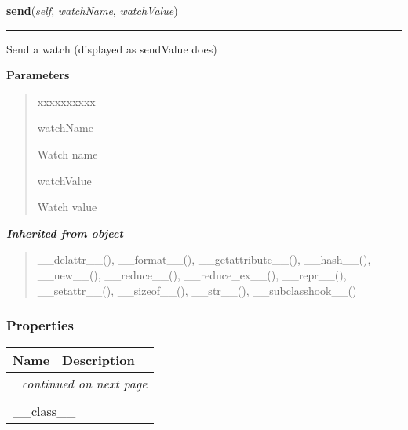 \hspace{.8\funcindent}\begin{boxedminipage}{\funcwidth}

    \raggedright \textbf{send}(\textit{self}, \textit{watchName}, \textit{watchValue})

    \vspace{-1.5ex}

    \rule{\textwidth}{0.5\fboxrule}
\setlength{\parskip}{2ex}
    Send a watch (displayed as sendValue does)

\setlength{\parskip}{1ex}
      \textbf{Parameters}
      \vspace{-1ex}

      \begin{quote}
        \begin{Ventry}{xxxxxxxxxx}

          \item[watchName]

          Watch name

          \item[watchValue]

          Watch value

        \end{Ventry}

      \end{quote}

    \end{boxedminipage}


\large{\textbf{\textit{Inherited from object}}}

\begin{quote}
\_\_delattr\_\_(), \_\_format\_\_(), \_\_getattribute\_\_(), \_\_hash\_\_(), \_\_new\_\_(), \_\_reduce\_\_(), \_\_reduce\_ex\_\_(), \_\_repr\_\_(), \_\_setattr\_\_(), \_\_sizeof\_\_(), \_\_str\_\_(), \_\_subclasshook\_\_()
\end{quote}


  \subsubsection{Properties}

    \vspace{-1cm}
\hspace{\varindent}\begin{longtable}{|p{\varnamewidth}|p{\vardescrwidth}|l}
\cline{1-2}
\cline{1-2} \centering \textbf{Name} & \centering \textbf{Description}& \\
\cline{1-2}
\endhead\cline{1-2}\multicolumn{3}{r}{\small\textit{continued on next page}}\\\endfoot\cline{1-2}
\endlastfoot\multicolumn{2}{|l|}{\textit{Inherited from object}}\\
\multicolumn{2}{|p{\varwidth}|}{\raggedright \_\_class\_\_}\\
\cline{1-2}
\end{longtable}


